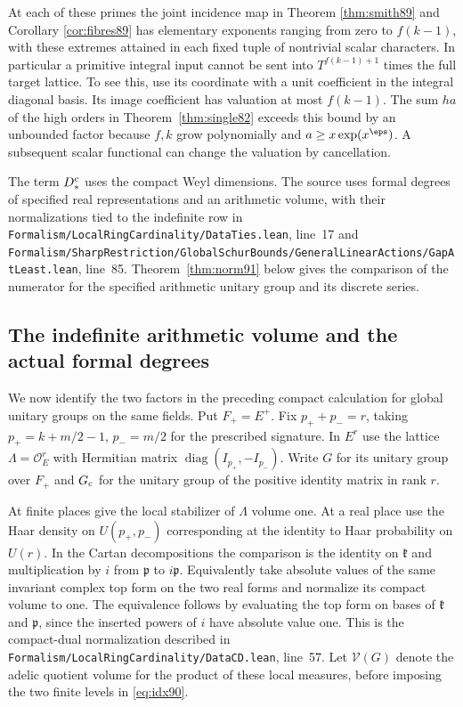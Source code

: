 \documentclass[a4paper,11pt]{article}
\theoremstyle{definition}
\theoremstyle{remark}
\newcommand{\srcloc}[2]{{\small\nolinkurl{#1.lean}}, line~#2}
\numberwithin{equation}{section}
\begin{document}
At each of these primes the joint incidence map in
Theorem \ref{thm:smith89} and Corollary \ref{cor:fibres89} has elementary exponents ranging from zero
to \(f(k-1)\), with these extremes attained in each fixed tuple
of nontrivial scalar characters. In particular a primitive
integral input cannot be sent into \(T^{f(k-1)+1}\) times the
full target lattice. To see this, use its coordinate with a
unit coefficient in the integral diagonal basis. Its image
coefficient has valuation at most \(f(k-1)\). The sum \(ha\)
of the high orders in Theorem~\ref{thm:single82} exceeds this
bound by an unbounded factor because \(f,k\) grow polynomially
and \(a\ge x\exp(x^\eps)\). A subsequent scalar functional
can change the valuation by cancellation.

The term \(D_*^{\rm c}\) uses the compact Weyl dimensions.
The source uses formal degrees of specified real representations
and an arithmetic volume, with their normalizations tied to the
indefinite row in \srcloc{Formalism/LocalRingCardinality/DataTies}{17}
and \srcloc{Formalism/SharpRestriction/GlobalSchurBounds/GeneralLinearActions/GapAtLeast}{85}.
Theorem~\ref{thm:norm91} below gives the comparison of the numerator for the specified arithmetic unitary group and its discrete series.

\subsection{The indefinite arithmetic volume and the actual formal degrees}\label{nav:VI-22}
We now identify the two factors in the preceding compact calculation
for global unitary groups on the same fields. Put \(F_+=E^+\).
Fix \(p_++p_-=r\), taking \(p_+=k+m/2-1\), \(p_-=m/2\) for
the prescribed signature. In \(E^r\) use the lattice
\(\Lambda=\mathcal O_E^r\) with Hermitian matrix
\(\operatorname{diag}(I_{p_+},-I_{p_-})\). Write \(G\) for its
unitary group over \(F_+\) and \(G_{\rm c}\) for the unitary
group of the positive identity matrix in rank \(r\).

At finite places give the local stabilizer of \(\Lambda\) volume
one. At a real place use the Haar density on \(U(p_+,p_-)\)
corresponding at the identity to Haar probability on \(U(r)\).
In the Cartan decompositions the comparison is the identity on
\(\mathfrak k\) and multiplication by \(i\) from \(\mathfrak p\)
to \(i\mathfrak p\). Equivalently take absolute values of the
same invariant complex top form on the two real forms and
normalize its compact volume to one. The equivalence follows
by evaluating the top form on bases of \(\mathfrak k\) and
\(\mathfrak p\), since the inserted powers of \(i\) have
absolute value one. This is the compact-dual normalization
described in \srcloc{Formalism/LocalRingCardinality/DataCD}{57}.
Let \(\mathcal V(G)\) denote the adelic quotient volume for the
product of these local measures, before imposing the two finite
levels in \eqref{eq:idx90}.
\end{document}
